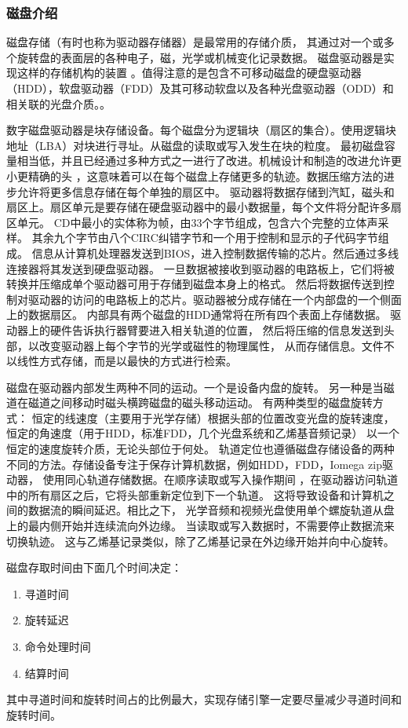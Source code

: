 \subsubsection{磁盘介绍}
磁盘存储（有时也称为驱动器存储器）是最常用的存储介质，
其通过对一个或多个旋转盘的表面层的各种电子，磁，光学或机械变化记录数据。
磁盘驱动器是实现这样的存储机构的装置
。值得注意的是包含不可移动磁盘的硬盘驱动器（HDD），软盘驱动器（FDD）及其可移动软盘以及各种光盘驱动器（ODD）和相关联的光盘介质。。

数字磁盘驱动器是块存储设备。每个磁盘分为逻辑块（扇区的集合）。使用逻辑块地址（LBA）对块进行寻址。从磁盘的读取或写入发生在块的粒度。
最初磁盘容量相当低，并且已经通过多种方式之一进行了改进。机械设计和制造的改进允许更小更精确的头
，这意味着可以在每个磁盘上存储更多的轨迹。数据压缩方法的进步允许将更多信息存储在每个单独的扇区中。
驱动器将数据存储到汽缸，磁头和扇区上。扇区单元是要存储在硬盘驱动器中的最小数据量，每个文件将分配许多扇区单元。
CD中最小的实体称为帧，由33个字节组成，包含六个完整的立体声采样。
其余九个字节由八个CIRC纠错字节和一个用于控制和显示的子代码字节组成。
信息从计算机处理器发送到BIOS，进入控制数据传输的芯片。然后通过多线连接器将其发送到硬盘驱动器。
一旦数据被接收到驱动器的电路板上，它们将被转换并压缩成单个驱动器可用于存储到磁盘本身上的格式。
然后将数据传送到控制对驱动器的访问的电路板上的芯片。驱动器被分成存储在一个内部盘的一个侧面上的数据扇区。
内部具有两个磁盘的HDD通常将在所有四个表面上存储数据。
驱动器上的硬件告诉执行器臂要进入相关轨道的位置，
然后将压缩的信息发送到头部，以改变驱动器上每个字节的光学或磁性的物理属性，
从而存储信息。文件不以线性方式存储，而是以最快的方式进行检索。

磁盘在驱动器内部发生两种不同的运动。一个是设备内盘的旋转。
另一种是当磁道在磁道之间移动时磁头横跨磁盘的磁头移动运动。
有两种类型的磁盘旋转方式：
恒定的线速度（主要用于光学存储）根据头部的位置改变光盘的旋转速度，
恒定的角速度（用于HDD，标准FDD，几个光盘系统和乙烯基音频记录）
以一个恒定的速度旋转介质，无论头部位于何处。
轨道定位也遵循磁盘存储设备的两种不同的方法。存储设备专注于保存计算机数据，例如HDD，FDD，Iomega zip驱动器，
使用同心轨道存储数据。在顺序读取或写入操作期间
，在驱动器访问轨道中的所有扇区之后，它将头部重新定位到下一个轨道。
这将导致设备和计算机之间的数据流的瞬间延迟。相比之下，
光学音频和视频光盘使用单个螺旋轨道从盘上的最内侧开始并连续流向外边缘。
当读取或写入数据时，不需要停止数据流来切换轨迹。
这与乙烯基记录类似，除了乙烯基记录在外边缘开始并向中心旋转。

磁盘存取时间由下面几个时间决定：
\begin{enumerate}
	\item 寻道时间
	\item 旋转延迟
	\item 命令处理时间
	\item 结算时间
\end{enumerate}
其中寻道时间和旋转时间占的比例最大，实现存储引擎一定要尽量减少寻道时间和旋转时间。

